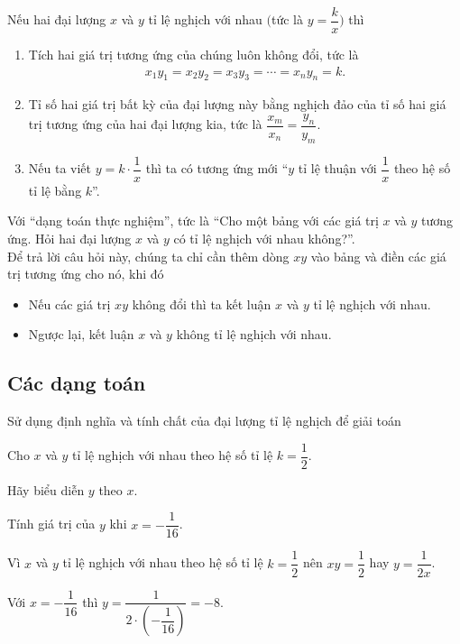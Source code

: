 \begin{tc}
 Nếu hai đại lượng $x$ và $y$ tỉ lệ nghịch với nhau $\bigg($tức là $y=\dfrac{k}{x}\bigg)$ thì
 \begin{enumerate}
  \item Tích hai giá trị tương ứng của chúng luôn không đổi, tức là
  \begin{eqnarray*}
   x_1y_1 = x_2y_2 = x_3y_3 = \cdots = x_ny_n = k.
  \end{eqnarray*}
  \item Tỉ số hai giá trị bất kỳ của đại lượng này bằng nghịch đảo của tỉ số hai giá trị tương ứng của hai đại lượng kia, tức là $\dfrac{x_m}{x_n} = \dfrac{y_n}{y_m}$.
  \item Nếu ta viết $y=k\cdot\dfrac{1}{x}$ thì ta có tương ứng mới ``$y$ tỉ lệ thuận với $\dfrac{1}{x}$ theo hệ số tỉ lệ bằng $k$''.
 \end{enumerate}
\end{tc}

\begin{note}
 Với ``dạng toán thực nghiệm'', tức là ``Cho một bảng với các giá trị $x$ và $y$ tương ứng. Hỏi hai đại lượng $x$ và $y$ có tỉ lệ nghịch với nhau không?''.\\
 Để trả lời câu hỏi này, chúng ta chỉ cần thêm dòng $xy$ vào bảng và điền các giá trị tương ứng cho nó, khi đó
 \begin{itemize}
  \item Nếu các giá trị $xy$ không đổi thì ta kết luận $x$ và $y$ tỉ lệ nghịch với nhau.
  \item Ngược lại, kết luận $x$ và $y$ không tỉ lệ nghịch với nhau.
 \end{itemize}
\end{note}


\subsection{Các dạng toán}

\begin{dang}{Sử dụng định nghĩa và tính chất của đại lượng tỉ lệ nghịch để giải toán}
 
\end{dang}

\begin{vd}%
 Cho $x$ và $y$ tỉ lệ nghịch với nhau theo hệ số tỉ lệ $k=\dfrac{1}{2}$.
 \begin{enumEX}{2}
  \item Hãy biểu diễn $y$ theo $x$.
  \item Tính giá trị của $y$ khi $x=-\dfrac{1}{16}$.
 \end{enumEX}
 \loigiai
  {
  \begin{listEX}
   \item Vì $x$ và $y$ tỉ lệ nghịch với nhau theo hệ số tỉ lệ $k=\dfrac{1}{2}$ nên $xy=\dfrac{1}{2}$ hay $y=\dfrac{1}{2x}$.
   \item Với $x=-\dfrac{1}{16}$ thì $y=\dfrac{1}{2 \cdot\left(-\dfrac{1}{16}\right)} = -8$.
  \end{listEX}
  }
\end{vd}


